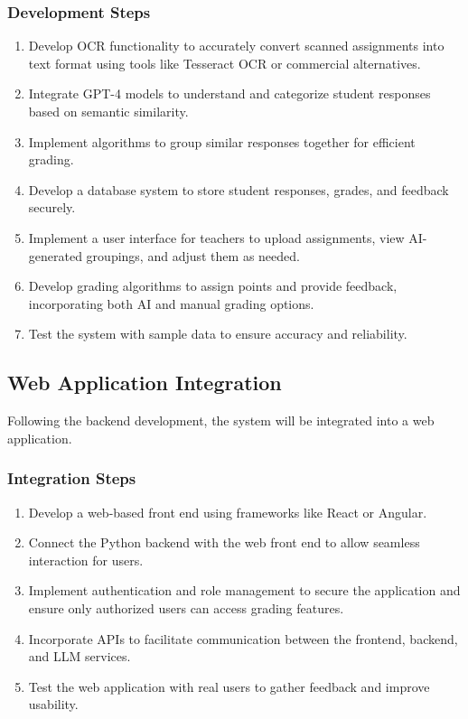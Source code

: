 \documentclass[ms,twoside,print]{nuthesis}
\begin{document}
\subsubsection{Development Steps}
\begin{enumerate}
    \item Develop OCR functionality to accurately convert scanned assignments into text format using tools like Tesseract OCR or commercial alternatives.
    \item Integrate GPT-4 models to understand and categorize student responses based on semantic similarity.
    \item Implement algorithms to group similar responses together for efficient grading.
    \item Develop a database system to store student responses, grades, and feedback securely.
    \item Implement a user interface for teachers to upload assignments, view AI-generated groupings, and adjust them as needed.
    \item Develop grading algorithms to assign points and provide feedback, incorporating both AI and manual grading options.
    \item Test the system with sample data to ensure accuracy and reliability.
\end{enumerate}

\subsection{Web Application Integration}
Following the backend development, the system will be integrated into a web application.

\subsubsection{Integration Steps}
\begin{enumerate}
    \item Develop a web-based front end using frameworks like React or Angular.
    \item Connect the Python backend with the web front end to allow seamless interaction for users.
    \item Implement authentication and role management to secure the application and ensure only authorized users can access grading features.
    \item Incorporate APIs to facilitate communication between the frontend, backend, and LLM services.
    \item Test the web application with real users to gather feedback and improve usability.
\end{enumerate}
\end{document}

